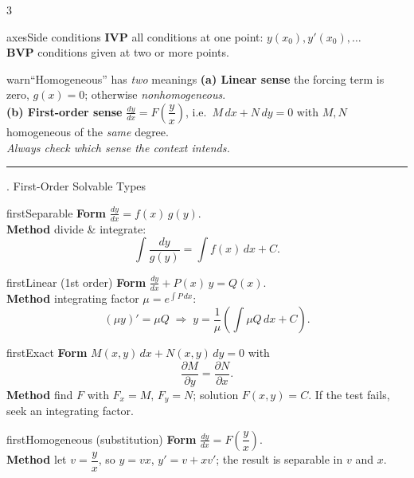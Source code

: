 \documentclass[10pt]{article}
\newcommand{\lab}[1]{\textcolor{ink}{\sffamily\footnotesize\textbf{#1}}\;}
\newcommand{\dydx}{\frac{dy}{dx}}
\newcommand{\sect}[2]{%
  \begin{tcolorbox}[blanker, breakable, before skip=2pt, after skip=2pt]
    \begingroup\sffamily\bfseries\normalsize\color{#1}%
    {\color{#1}\rule[-1pt]{3pt}{12pt}}\;#2\endgroup
    \par\vspace{1pt}{\color{#1}\hrule height 1pt}
\end{tcolorbox}}
\begin{document}
\begin{multicols}{3}
  \begin{card}{axes}{Side conditions}
    \lab{IVP} all conditions at one point: $y(x_0),y'(x_0),\dots$\\
    \lab{BVP} conditions given at two or more points.
  \end{card}

  \begin{card}{warn}{``Homogeneous'' has \emph{two} meanings}
    \lab{(a) Linear sense} the forcing term is zero, $g(x)=0$; otherwise \emph{nonhomogeneous}.\\[2pt]
    \lab{(b) First-order sense} $\dydx=F\!\left(\dfrac{y}{x}\right)$, i.e.\ $M\,dx+N\,dy=0$ with $M,N$ homogeneous of the \emph{same} degree.\\[2pt]
    \textit{Always check which sense the context intends.}
  \end{card}

  \columnbreak
  \sect{first}{2.\; First-Order Solvable Types}

  \begin{card}{first}{Separable}
    \lab{Form} $\dydx=f(x)\,g(y)$.\\
    \lab{Method} divide \& integrate:
    \[
      \int\frac{dy}{g(y)}=\int f(x)\,dx + C.
    \]
  \end{card}

  \begin{card}{first}{Linear (1st order)}
    \lab{Form} $\dydx+P(x)\,y=Q(x)$.\\
    \lab{Method} integrating factor $\mu=e^{\int P\,dx}$:
    \[
      (\mu y)'=\mu Q \;\Rightarrow\; y=\frac{1}{\mu}\!\left(\int \mu Q\,dx + C\right).
    \]
  \end{card}

  \begin{card}{first}{Exact}
    \lab{Form} $M(x,y)\,dx+N(x,y)\,dy=0$ with
    \[
      \frac{\partial M}{\partial y}=\frac{\partial N}{\partial x}.
    \]
    \lab{Method} find $F$ with $F_x=M,\,F_y=N$; solution $F(x,y)=C$. If the test fails, seek an integrating factor.
  \end{card}

  \begin{card}{first}{Homogeneous (substitution)}
    \lab{Form} $\dydx=F\!\left(\dfrac{y}{x}\right)$.\\
    \lab{Method} let $v=\dfrac{y}{x}$, so $y=vx$, $y'=v+xv'$; the result is separable in $v$ and $x$.
  \end{card}


\end{multicols}
\end{document}
